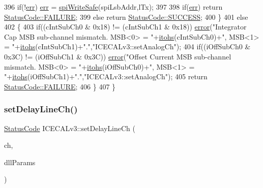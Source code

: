 \begin{DoxyCode}
396         \textcolor{keywordflow}{if}(!\hyperlink{classICECALv3_ad8989925ee5b3ff322d863ce6aaff0bd}{err}) \hyperlink{classICECALv3_ad8989925ee5b3ff322d863ce6aaff0bd}{err} = \hyperlink{classICECALv3_aa0b8358ea0be8e47a8aded5e1551787f}{spiWriteSafe}(spiLsbAddr,lTx);
397 
398         \textcolor{keywordflow}{if}(\hyperlink{classICECALv3_ad8989925ee5b3ff322d863ce6aaff0bd}{err}) \textcolor{keywordflow}{return} \hyperlink{classStatusCode_a6f565cbeadc76d14c72f047e5e85eb4ba3da73d4c469762eb9d3c960368252b26}{StatusCode::FAILURE};
399         \textcolor{keywordflow}{else}        \textcolor{keywordflow}{return} \hyperlink{classStatusCode_a6f565cbeadc76d14c72f047e5e85eb4badd0da38d3ba0d922efd1f4619bc37ad8}{StatusCode::SUCCESS};
400     \}
401     \textcolor{keywordflow}{else} 
402     \{
403         \textcolor{keywordflow}{if}((cIntSubCh0 & 0x18) != (cIntSubCh1 & 0x18)) \hyperlink{classObject_a204a95f57818c0f811933917a30eff45}{error}(\textcolor{stringliteral}{"Integrator Cap MSB sub-channel mismatch.
       MSB<0> = "}+\hyperlink{classICECALv3_a04b02e583f191bfce34d05132cd23834}{itohs}(cIntSubCh0)+\textcolor{stringliteral}{", MSB<1> = "}+\hyperlink{classICECALv3_a04b02e583f191bfce34d05132cd23834}{itohs}(cIntSubCh1)+\textcolor{stringliteral}{"."},\textcolor{stringliteral}{"ICECALv3::setAnalogCh"});
404         \textcolor{keywordflow}{if}((iOffSubCh0 & 0x3C) != (iOffSubCh1 & 0x3C)) \hyperlink{classObject_a204a95f57818c0f811933917a30eff45}{error}(\textcolor{stringliteral}{"Offset Current MSB sub-channel mismatch.
       MSB<0> = "}+\hyperlink{classICECALv3_a04b02e583f191bfce34d05132cd23834}{itohs}(iOffSubCh0)+\textcolor{stringliteral}{", MSB<1> = "}+\hyperlink{classICECALv3_a04b02e583f191bfce34d05132cd23834}{itohs}(iOffSubCh1)+\textcolor{stringliteral}{"."},\textcolor{stringliteral}{"ICECALv3::setAnalogCh"});
405         \textcolor{keywordflow}{return} \hyperlink{classStatusCode_a6f565cbeadc76d14c72f047e5e85eb4ba3da73d4c469762eb9d3c960368252b26}{StatusCode::FAILURE};
406     \}
407 \}
\end{DoxyCode}
\mbox{\label{classICECALv3_a14a7a29c9a3412c062f053cc616b860a}} 
\subsubsection{\texorpdfstring{set\+Delay\+Line\+Ch()}{setDelayLineCh()}}
{\footnotesize\ttfamily \hyperlink{classStatusCode}{Status\+Code} I\+C\+E\+C\+A\+Lv3\+::set\+Delay\+Line\+Ch (\begin{DoxyParamCaption}\item[{int}]{ch,  }\item[{Py\+Object $\ast$}]{dll\+Params }\end{DoxyParamCaption})}



